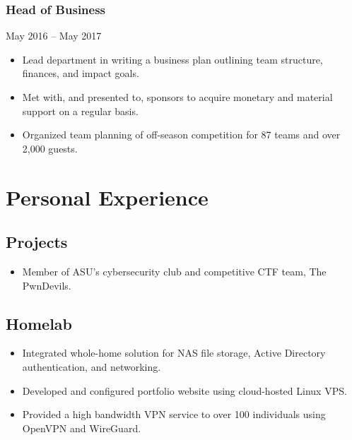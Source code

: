 \documentclass{article}
\begin{document}
\subsubsection{Head of Business}
May 2016 – May 2017
\begin{itemize}[leftmargin=*]
\item Lead department in writing a business plan outlining team structure, finances, and impact goals.
\item Met with, and presented to, sponsors to acquire monetary and material support on a regular basis.
\item Organized team planning of off-season competition for 87 teams and over 2,000 guests.
\end{itemize}

\section{Personal Experience}
\subsection{Projects}
\begin{itemize}[leftmargin=*]
\item Member of ASU’s cybersecurity club and competitive CTF team, The PwnDevils.
\end{itemize}
\subsection{Homelab}
\begin{itemize}[leftmargin=*]
\item Integrated whole-home solution for NAS file storage, Active Directory authentication, and networking.
\item Developed and configured portfolio website using cloud-hosted Linux VPS.
\item Provided a high bandwidth VPN service to over 100 individuals using OpenVPN and WireGuard.
\end{itemize}
\end{document}
